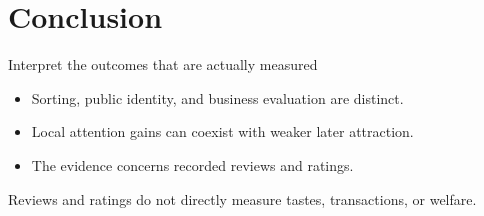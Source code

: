 \documentclass[aspectratio=169,11pt]{beamer}
\begin{document}
\section{Conclusion}
\begin{frame}{Interpret the outcomes that are actually measured}
\begin{itemize}\setlength{\itemsep}{0.7cm}
  \item Sorting, public identity, and business evaluation are distinct.
  \item Local attention gains can coexist with weaker later attraction.
  \item The evidence concerns recorded reviews and ratings.
\end{itemize}
\vspace{0.65cm}
\begin{PMtakeaway}
Reviews and ratings do not directly measure tastes, transactions, or welfare.
\end{PMtakeaway}
\end{frame}
\end{document}

